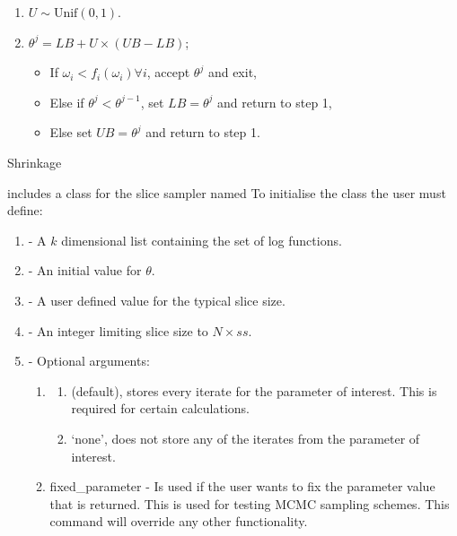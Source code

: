 \documentclass[article]{jss}
\begin{document}
%
\begin{algorithm}[H]
\begin{enumerate}
\item $U\sim\mbox{Unif}(0,1)$. 
\item $\theta^{j}=LB+U{\times}(UB-LB)$;

\begin{itemize}
\item If $\omega_{i}<f_{i}(\omega_{i})\forall i$, accept $\theta^{j}$
and exit, 
\item Else if $\theta^{j}<\theta^{j-1}$, set $LB=\theta^{j}$ and return
to step 1, 
\item Else set $UB=\theta^{j}$ and return to step 1. 
\end{itemize}
\end{enumerate}
\caption{Shrinkage}
\label{alg:shrinkage}
\end{algorithm}


 includes a class for the slice sampler named
To initialise the class the user must define:
\begin{enumerate}
\item {} - A $k$ dimensional list containing the set of log
  functions.
\item {} - An initial value for $\theta$.
\item {} - A user defined value for the typical slice size.
\item {} - An integer limiting slice size to $N\times ss$.
\item {} - Optional arguments:
   
  \begin{enumerate}
  \item {}
    \begin{enumerate}
    \item {} (default), stores every iterate for the
      parameter of interest. This is required for certain
      calculations.
    \item `none', does not store any of the iterates from the
      parameter of interest.
    \end{enumerate}
  \item fixed\_parameter - Is used if the user wants to fix the
    parameter value that is returned. This is used for testing MCMC
    sampling schemes.  This command will override any other
    functionality.
  \end{enumerate}
\end{enumerate}
\end{document}
